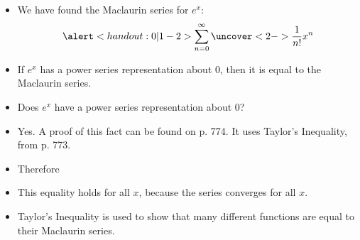 \begin{frame}
\begin{itemize}
\item  We have found the Maclaurin series for $e^x$:
\abovedisplayskip=0pt
\belowdisplayskip=0pt
\[
\alert<handout:0| 1-2>{\sum_{n=0}^\infty \uncover<2->{\frac{1}{n!}}x^n}
\]
\item<3->  If $e^x$ has a power series representation about $0$, then it is equal to the Maclaurin series.
\item<3->  Does $e^x$ have a power series representation about $0$?
\item<4->  Yes.  A proof of this fact can be found on p. 774.  It uses Taylor's Inequality, from p. 773.
\item<5->  Therefore
%
\item<6->  This equality holds for all $x$, because the series converges for all $x$.
\item<7->  Taylor's Inequality is used to show that many different functions are equal to their Maclaurin series.
\end{itemize}
\end{frame}
